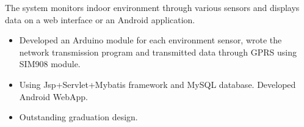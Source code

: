 \documentclass{resume}
\begin{document}
The system monitors indoor environment through various sensors and displays data on a web interface or an Android application.
\begin{itemize}
  \item Developed an Arduino module for each environment sensor, wrote the network transmission program and transmitted data through GPRS using SIM908 module.
  \item Using Jsp+Servlet+Mybatis framework and MySQL database. Developed Android WebApp.
  \item Outstanding graduation design.
\end{itemize}


%
%
\end{document}
